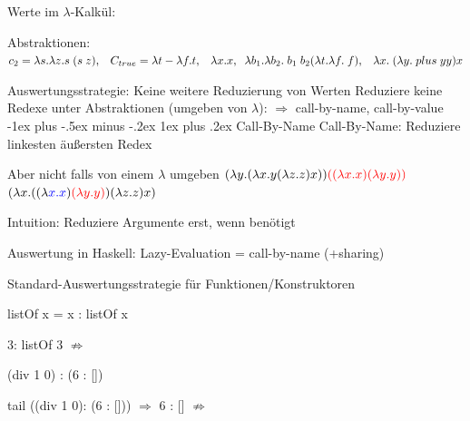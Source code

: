 \documentclass[10pt]{article}
\makeatletter
\renewcommand{\subsubsection}{\@startsection{subsubsection}{3}{0mm}%
                                {-1ex plus -.5ex minus -.2ex}%
                                {1ex plus .2ex}%
                                {\normalfont\small\bfseries}}
\makeatother
\begin{document}
  \color{blue} Werte im $\lambda$-Kalkül:
  \color{black} \begin{itemize*}
    \item Abstraktionen: $c_2 = \lambda s. \lambda z.s\;(s\;z),\;\;\; C_{true} = \lambda t- \lambda f.t,\;\;\; \lambda x.x,\;\;\; \newline \lambda b_1. \lambda b_2.\;b_1\; b_2 (\lambda t.\lambda f.\;f),\;\;\; \lambda x.\;(\lambda y.\;plus\; yy)x$
  \end{itemize*}
  \color{blue} Auswertungsstrategie: \color{black} Keine weitere Reduzierung von Werten \newline
  Reduziere keine Redexe unter Abstraktionen (umgeben von $\lambda$):\newline
$\Rightarrow$ call-by-name, call-by-value
  \subsubsection{Call-By-Name}
  Call-By-Name: Reduziere linkesten äußersten Redex
  \begin{itemize*}
    \item Aber nicht falls von einem $\lambda$ umgeben \newline
    \subitem $(\lambda y. (\lambda x.y(\lambda z.z)x))\color{red} ((\lambda x.x)(\lambda y.y))$ \color{black} \newline
    \subitem	$(\lambda x.((\lambda \color{blue}x.x\color{black}) \color{red}(\lambda y.y)\color{black})(\lambda z.z)x)$
    \begin{center}
      \item Intuition: Reduziere Argumente erst, wenn benötigt
    \end{center}
  \end{itemize*}
  
  Auswertung in Haskell: \color{blue} Lazy-Evaluation = call-by-name (+sharing)\color{black}
  \begin{itemize*}
    \item Standard-Auswertungsstrategie für Funktionen/Konstruktoren
    \item listOf x = x : listOf x
    \item 3: listOf 3 $\nRightarrow$
    \item (div 1 0) : (6 : [])
    \item tail ((div 1 0): (6 : [])) $\Rightarrow$ 6 : [] $\nRightarrow$
  \end{itemize*}
  
\end{document}
